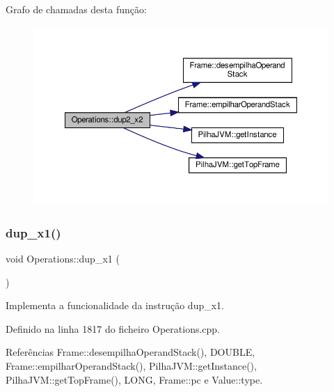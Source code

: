 Grafo de chamadas desta função\+:\nopagebreak
\begin{figure}[H]
\begin{center}
\leavevmode
\includegraphics[width=350pt]{classOperations_ab49247b3958376b27e8347e053dfe7de_cgraph}
\end{center}
\end{figure}
\mbox{\label{classOperations_a46bab81a4a4bd1eda1c89b0b74f9e014}} 
\subsubsection{\texorpdfstring{dup\+\_\+x1()}{dup\_x1()}}
{\footnotesize\ttfamily void Operations\+::dup\+\_\+x1 (\begin{DoxyParamCaption}{ }\end{DoxyParamCaption})\hspace{0.3cm}{\ttfamily [private]}}



Implementa a funcionalidade da instrução dup\+\_\+x1. 



Definido na linha 1817 do ficheiro Operations.\+cpp.



Referências Frame\+::desempilha\+Operand\+Stack(), D\+O\+U\+B\+LE, Frame\+::empilhar\+Operand\+Stack(), Pilha\+J\+V\+M\+::get\+Instance(), Pilha\+J\+V\+M\+::get\+Top\+Frame(), L\+O\+NG, Frame\+::pc e Value\+::type.

